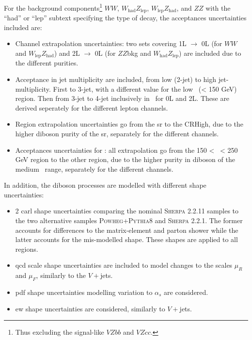 For the background components\footnote{Thus excluding the signal-like $VZbb$ and $VZcc$.} $WW$, $W_{\text{had}}Z_{\text{lep}}$, $W_{\text{lep}}Z_{\text{had}}$, and $ZZ$ with the ``had'' or ``lep'' subtext specifying the type of decay, the acceptances uncertainties included are:
\begin{itemize}[leftmargin=*]
    \item Channel extrapolation uncertainties: two sets covering 1L $\rightarrow$ 0L (for $WW$ and $W_{\text{lep}}Z_{\text{had}}$) and 2L $\rightarrow$ 0L (for $ZZ$bkg and $W_{\text{had}}Z_{\text{lep}}$) are included due to the different purities.
    \item Acceptance in jet multiplicity are included, from low (2-jet) to high jet-multiplicity. First to 3-jet, with a different value for the low \ptv\ (< 150 GeV) region. Then from 3-jet to 4-jet inclusively in \ptv\ for 0L and 2L. These are derived seperately for the different lepton channels. %
    \item Region extrapolation uncertainties go from the \gls{sr} to the CRHigh, due to the higher diboson purity of the \gls{sr}, separately for the different channels.
    \item Acceptances uncertainties for \ptv: all extrapolation go from the 150 < \ptv\ < 250 GeV region to the other region, due to the higher purity in diboson of the medium \ptv\ range, separately for the different channels.
\end{itemize}

In addition, the diboson processes are modelled with different shape uncertainties:
\begin{itemize}
    \item 2 \gls{carl} shape uncertainties comparing the nominal \textsc{Sherpa} 2.2.11 samples to the two alternative samples \textsc{Powheg}+\textsc{Pythia}8 and \textsc{Sherpa} 2.2.1. The former accounts for differences to the matrix-element and parton shower while the latter accounts for the mis-modelled \ptv shape. These shapes are applied to all regions.
    \item \gls{qcd} scale shape uncertainties are included to model changes to the scales $\mu_R$ and $\mu_F$, similarly to the $V+$jets.
    \item \gls{pdf} shape uncertainties modelling variation to $\alpha_s$ are considered.
    \item \gls{ew} shape uncertainties are considered, similarly to $V+$jets.
\end{itemize}

